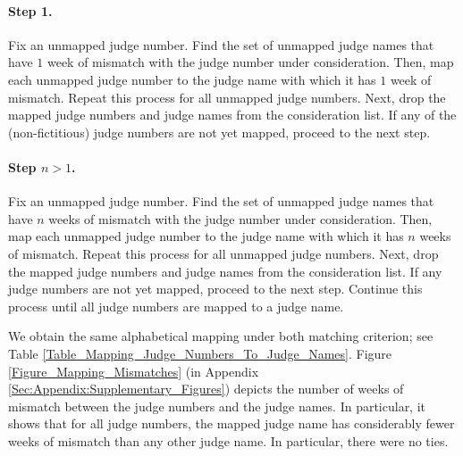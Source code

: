 \documentclass[11pt]{article}
\theoremstyle{ModifiedStyle}
\begin{document}
  	\paragraph{Step 1.} Fix an unmapped judge number. Find the set of unmapped judge names that have $1$ week of mismatch with the judge number under consideration. Then, map each unmapped judge number to the judge name with which it has $1$ week of mismatch. Repeat this process for all unmapped judge numbers. Next, drop the mapped judge numbers and judge names from the consideration list. If any of the (non-fictitious) judge numbers are not yet mapped, proceed to the next step.
  	\vspace{-5mm}
  	\paragraph{Step $n>1$.} Fix an unmapped judge number. Find the set of unmapped judge names that have $n$ weeks of mismatch with the judge number under consideration. Then, map each unmapped judge number to the judge name with which it has $n$ weeks of mismatch. Repeat this process for all unmapped judge numbers. Next, drop the mapped judge numbers and judge names from the consideration list. If any judge numbers are not yet mapped, proceed to the next step. Continue this process until all judge numbers are mapped to a judge name.

  	We obtain the same alphabetical mapping under both matching criterion; see Table \ref{Table_Mapping_Judge_Numbers_To_Judge_Names}. Figure \ref{Figure_Mapping_Mismatches} (in Appendix \ref{Sec:Appendix:Supplementary_Figures}) depicts the number of weeks of mismatch between the judge numbers and the judge names. In particular, it shows that for all judge numbers, the mapped judge name has considerably fewer weeks of mismatch than any other judge name. In particular, there were no ties.
\end{document}
